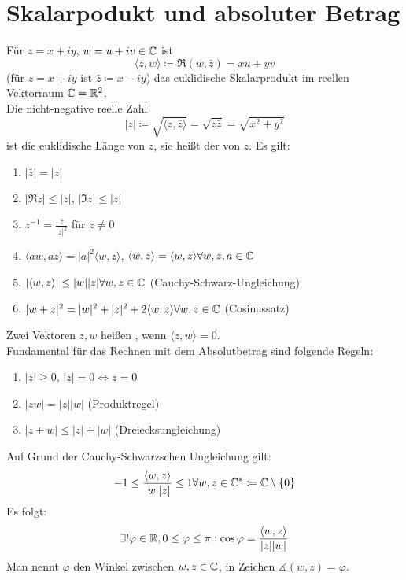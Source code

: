 \section*{Skalarpodukt und absoluter Betrag}
F\"ur $ z=x+iy $, $ w=u+iv \in\mathbb{C}$ ist \[ \langle z,w\rangle\coloneqq\Re(w,\bar z)=xu+yv \]
(f\"ur $ z=x+iy $ ist $ \bar z\coloneqq x-iy $) das euklidische Skalarprodukt im reellen Vektorraum $ \mathbb{C}=\mathbb{R}^2 $.\\
Die nicht-negative reelle Zahl \[ |z|\coloneqq\sqrt{\langle z,\bar z\rangle}=\sqrt{z\bar z}=\sqrt{x^2+y^2} \]
ist die euklidische L\"ange von $ z $, sie hei\ss t der  von $ z $. Es gilt:
\begin{enumerate}
\item $ |\bar z|=|z| $
\item $ |\Re z|\leq|z| $, $ |\Im z|\leq |z| $
\item $ z^{-1}=\frac{\bar z}{|z|^2} $ f\"ur $ z\neq 0 $
\item $ \langle aw, az\rangle=|a|^2\langle w,z\rangle $, $ \langle\bar w,\bar z\rangle=\langle w,z\rangle\forall w,z,a\in\mathbb{C} $
\item
$|\langle w,z\rangle|\leq|w||z|\forall w,z\in\mathbb{C}$ (Cauchy-Schwarz-Ungleichung)

\item
$|w+z|^2=|w|^2+|z|^2+2\langle w,z\rangle\forall w,z\in\mathbb{C} $ (Cosinussatz)
\end{enumerate}
Zwei Vektoren $ z,w $ hei\ss en , wenn $ \langle z,w\rangle=0 $.\\
Fundamental f\"ur das Rechnen mit dem Absolutbetrag sind folgende Regeln:
\begin{enumerate}
\item $ |z|\geq 0 $, $ |z|=0\Leftrightarrow z=0 $
\item $ |zw|=|z||w| $ (Produktregel)
\item $ |z+w|\leq|z|+|w| $ (Dreiecksungleichung)
\end{enumerate}
Auf Grund der Cauchy-Schwarzschen Ungleichung gilt:
\[ -1\leq\frac{\langle w,z\rangle}{|w||z|}\leq 1\forall w,z\in\mathbb{C}^\ast\coloneqq\mathbb{C}\setminus\lbrace 0\rbrace \]
Es folgt:
\[ \exists!\varphi\in\mathbb{R}, 0\leq\varphi\leq\pi: \cos\varphi=\frac{\langle w,z\rangle}{|z||w|} \]
Man nennt $ \varphi $ den Winkel zwischen $ w,z\in\mathbb{C} $, in Zeichen $ \measuredangle(w,z)=\varphi $. 